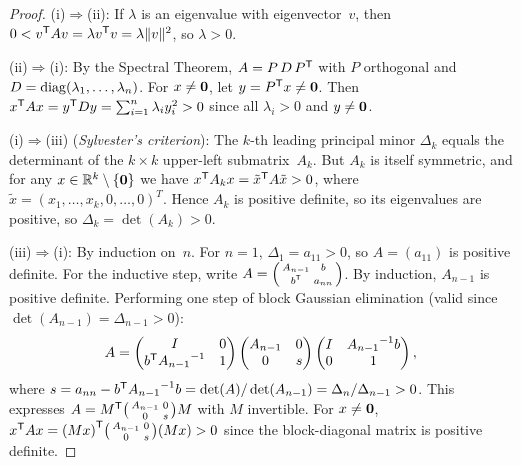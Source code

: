 \begin{proof}
(i)$\Rightarrow$(ii): If $\lambda$ is an eigenvalue with eigenvector~$v$,
then $0 < {v}^{\mathsf{T}}Av = \lambda{v}^{\mathsf{T}}v = \lambda\lVert v\rVert^2$,
so $\lambda > 0$.

(ii)$\Rightarrow$(i): By the Spectral Theorem, $A = P\,D\,{P}^{\mathsf{T}}$
with $P$ orthogonal and $D = \operatorname{diag}(\lambda_1,\ldots,\lambda_n)$.  For
$x\neq\mathbf{0}$, let $y = {P}^{\mathsf{T}}x \neq \mathbf{0}$.  Then
${x}^{\mathsf{T}}Ax = {y}^{\mathsf{T}}Dy = \sum_{i=1}^n \lambda_i y_i^2 > 0$
since all $\lambda_i>0$ and $y\neq\mathbf{0}$.

(i)$\Rightarrow$(iii) (\emph{Sylvester's criterion}): The $k$-th
leading principal minor $\Delta_k$ equals the determinant of the
$k\times k$ upper-left submatrix~$A_k$.  But $A_k$ is itself symmetric,
and for any $x\in{\mathbb{R}}^k\setminus\left\{\mathbf{0}\right\}$ we have
${x}^{\mathsf{T}}A_k x = {\tilde x}^{\mathsf{T}}A\tilde x > 0$, where
$\tilde x = (x_1,\ldots,x_k,0,\ldots,0)^T$.  Hence $A_k$ is positive
definite, so its eigenvalues are positive, so
$\Delta_k = \det(A_k) > 0$.

(iii)$\Rightarrow$(i): By induction on~$n$.  For $n=1$, $\Delta_1 = a_{11} > 0$,
so $A=(a_{11})$ is positive definite.  For the inductive step, write
$A = \begin{psmallmatrix} A_{n-1} & b \\ {b}^{\mathsf{T}} & a_{nn}\end{psmallmatrix}$.
By induction, $A_{n-1}$ is positive definite.  Performing one step of block
Gaussian elimination (valid since $\det(A_{n-1})=\Delta_{n-1}>0$):
\[
  A = \begin{pmatrix} I & 0 \\ {b}^{\mathsf{T}}{A_{n-1}}^{-1} & 1\end{pmatrix}
  \begin{pmatrix} A_{n-1} & 0 \\ 0 & s\end{pmatrix}
  \begin{pmatrix} I & {A_{n-1}}^{-1}b \\ 0 & 1\end{pmatrix},
\]
where $s = a_{nn} - {b}^{\mathsf{T}}{A_{n-1}}^{-1}b
= \det(A)/\det(A_{n-1}) = \Delta_n/\Delta_{n-1} > 0$.
This expresses $A = {M}^{\mathsf{T}}
\begin{psmallmatrix}A_{n-1}&0\\0&s\end{psmallmatrix} M$ with $M$ invertible.
For $x\neq\mathbf{0}$, ${x}^{\mathsf{T}}Ax = {(Mx)}^{\mathsf{T}}
\begin{psmallmatrix}A_{n-1}&0\\0&s\end{psmallmatrix}(Mx) > 0$
since the block-diagonal matrix is positive definite.


\end{proof}
